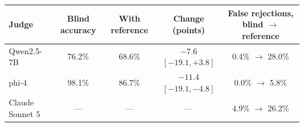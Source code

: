 \begin{tabular}{lcccc}
\toprule
Judge & Blind accuracy & With reference & Change (points) & False rejections, blind $\to$ reference \\
\midrule
Qwen2.5-7B & 76.2\% & 68.6\% & $-7.6$ {\scriptsize$[-19.1,+3.8]$} & 0.4\% $\to$ 28.0\% \\
phi-4 & 98.1\% & 86.7\% & $-11.4$ {\scriptsize$[-19.1,-4.8]$} & 0.0\% $\to$ 5.8\% \\
Claude Sonnet 5 & --- & --- & --- & 4.9\% $\to$ 26.2\% \\
\bottomrule
\end{tabular}
